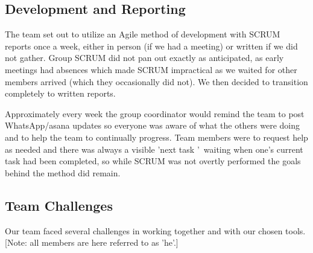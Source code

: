 \documentclass[11pt]{article}
\begin{document}
\begin{enumerate}
\subsection{Development and Reporting}

The team set out to utilize an Agile method of development with SCRUM reports once a week, either in person (if we had a meeting) or written if we did not gather. Group SCRUM did not pan out exactly as anticipated, as early meetings had absences which made SCRUM impractical as we waited for other members arrived (which they occasionally did not). We then decided to transition completely to written reports. 

Approximately every week the group coordinator would remind the team to post WhatsApp/asana updates so everyone was aware of what the others were doing and to help the team to continually progress. Team members were to request help as needed and there was always a visible \textquoteright next task \textquoteright\ waiting when one\textquoteright s current task had been completed, so while SCRUM was not overtly performed the goals behind the method did remain.


\subsection{Team Challenges}

Our team faced several challenges in working together and with our chosen tools. [Note: all members are here referred to as \textquoteright he\textquoteright .] 


\end{enumerate}
\end{document}
